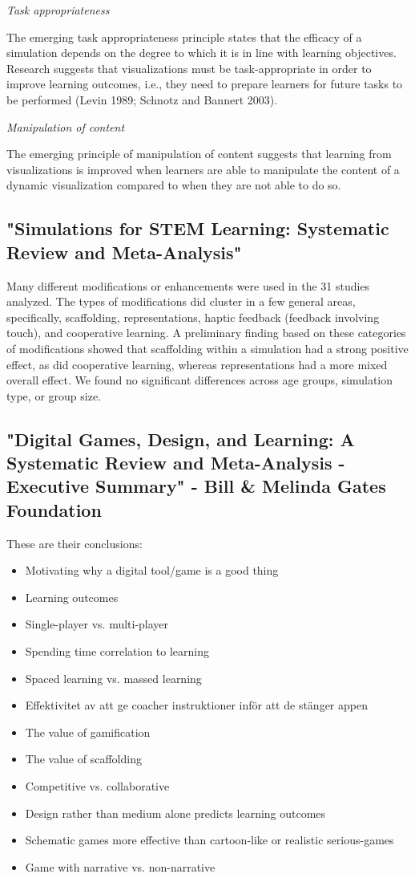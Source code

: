 \textit{Task appropriateness}

The emerging task appropriateness principle states that the efficacy of a simulation depends on the degree to which it is in line with learning objectives. Research suggests that visualizations must be task-appropriate in order to improve learning outcomes, i.e., they need to prepare learners for future tasks to be performed (Levin 1989; Schnotz and Bannert 2003).

\textit{Manipulation of content}

The emerging principle of manipulation of content suggests that learning from visualizations is improved when learners are able to manipulate the content of a dynamic visualization compared to when they are not able to do so.

\subsection{"Simulations for STEM Learning: Systematic Review and Meta-Analysis"}

Many different modifications or enhancements were used in the 31 studies analyzed. The types of modifications did cluster in a few general areas, specifically, scaffolding, representations, haptic feedback (feedback involving touch), and cooperative learning. A preliminary finding based on these categories of modifications showed that scaffolding within a simulation had a strong positive effect, as did cooperative learning, whereas representations had a more mixed overall effect. We found no significant differences across age groups, simulation type, or group size.

\subsection{"Digital Games, Design, and Learning: A Systematic Review and Meta-Analysis - Executive Summary" - Bill \& Melinda Gates Foundation}

These are their conclusions:
\begin{itemize}
    \item Motivating why a digital tool/game is a good thing
    \item Learning outcomes
    \item Single-player vs. multi-player
    \item Spending time correlation to learning
    \item Spaced learning vs. massed learning
    \item Effektivitet av att ge coacher instruktioner inför att de stänger appen
    \item The value of gamification
    \item The value of scaffolding
    \item Competitive vs. collaborative
    \item Design rather than medium alone predicts learning outcomes
    \item Schematic games more effective than cartoon-like or realistic serious-games
    \item Game with narrative vs. non-narrative
\end{itemize}

